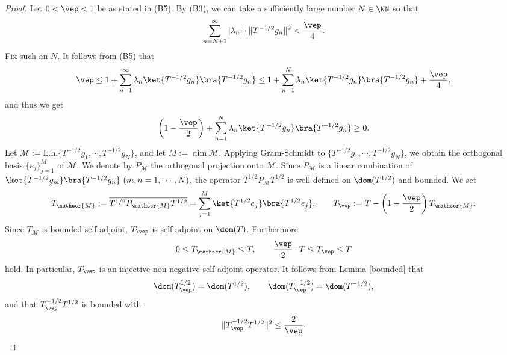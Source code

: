 \documentclass[12pt,draft]{article}
\theoremstyle{plain}
\numberwithin{equation}{section}
\theoremstyle{remark}
\begin{document}
\begin{proof}
Let $0<\vep<1$ be as stated in (B5).
By (B3), we can take a sufficiently large number $N\in\NN$ so that
\begin{equation}\label{vep/4}
\sum_{n=N+1}^\infty|\lambda_n|\cdot\|T^{-1/2}g_n\|^2<\frac{\vep}{4}.
\end{equation}
Fix such an $N$.
It follows from (B5) that
\[
 \vep \leq 1 + \sum_{n=1}^\infty \lambda_n \ket{T^{-1/2}g_n} \bra{T^{-1/2}g_n} 
 \leq 1 + \sum_{n=1}^N \lambda_n \ket{T^{-1/2}g_n} \bra{T^{-1/2}g_n} +\frac{\vep}{4},
\]
and thus we get
\begin{equation}\label{epsilon estimate}
\left(1-\frac{\vep}{2}\right)+\sum_{n=1}^N \lambda_n \ket{T^{-1/2}g_n} \bra{T^{-1/2}g_n} \geq 0.
\end{equation}
Let $\mathscr{M}:=\mathrm{L.h.}\{T^{-1/2}g_1,\cdots,T^{-1/2}g_N\}$, and let $M:=\dim \mathscr{M}$.
Applying Gram-Schmidt to $\{T^{-1/2}g_1,\cdots, T^{-1/2}g_N\}$, we obtain the orthogonal basis $\{e_j\}_{j=1}^M$ of $\mathscr{M}$.
We denote by $P_\mathscr{M}$ the orthogonal projection onto $\mathscr{M}$.
Since $P_\mathscr{M}$ is a linear combination of $\ket{T^{-1/2}g_m}\bra{T^{-1/2}g_n}\ (m,n=1,\cdots,N)$,
the operator $T^{1/2}P_\mathscr{M} T^{1/2}$ is well-defined on $\dom(T^{1/2})$ and bounded.
We set 
\begin{align}
  T_\mathscr{M} := \overline{T^{1/2}P_\mathscr{M} T^{1/2}} 
       = \sum_{j=1}^M \ket{T^{1/2}e_j}\bra{T^{1/2}e_j}, \qquad T_\vep:=T-\left(1-\frac{\vep}{2}\right)T_\mathscr{M}. \label{defTM}
\end{align}
Since $T_\mathscr{M}$ is bounded self-adjoint, $T_\vep$ is self-adjoint on $\dom(T)$.
Furthermore 
\begin{align*}
 0\leq T_\mathscr{M} \leq T, \qquad \frac{\vep}{2}\cdot T \leq T_\vep \leq T
\end{align*}
hold.
In particular, $T_\vep$ is an injective non-negative self-adjoint operator.
It follows from Lemma \ref{bounded} that
\begin{equation}\label{Tvep0}
\dom(T_\vep^{1/2})=\dom(T^{1/2}), \qquad \dom(T_\vep^{-1/2})=\dom(T^{-1/2}),
\end{equation}
and that $T_\vep^{-1/2}T^{1/2}$ is bounded with
\begin{equation}\label{Tvep1}
\|T_\vep^{-1/2}T^{1/2}\|^2\leq\frac{2}{\vep}.
\end{equation}


\end{proof}
\end{document}
